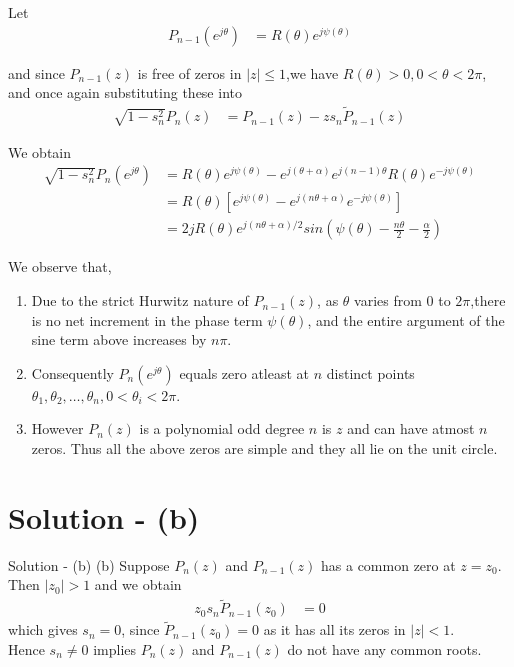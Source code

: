\documentclass{beamer}
\providecommand{\abs}[1]{\left\vert#1\right\vert}
\providecommand{\brak}[1]{\ensuremath{\left(#1\right)}}
\begin{document}
\begin{frame}
    Let 
    \begin{align}
        P_{n-1}(e^{j\theta}) &= R(\theta)e^{j\psi(\theta)}
    \end{align}

    and since $P_{n-1}(z)$ is free of zeros in $|z|\leq 1$,we have $R(\theta)>0,0<\theta<2\pi$, and once again substituting these into 
    \begin{align}
        \sqrt{1-s_n^2}P_n(z) &= P_{n-1}(z)-z s_n\tilde{P}_{n-1}(z)
    \end{align}
    
    We obtain
    \begin{align}
        \sqrt{1-s_n^2}P_n(e^{j\theta}) &= R(\theta)e^{j\psi(\theta)} - e^{j(\theta+\alpha)}e^{j(n-1)\theta}R(\theta)e^{-j\psi(\theta)}\\
        &= R(\theta)[e^{j\psi(\theta)}-e^{j(n\theta+\alpha)}e^{-j\psi(\theta)}]\\
        &= 2jR(\theta)e^{j(n\theta+\alpha)/2} sin\brak{\psi(\theta)-\frac{n\theta}{2}-\frac{\alpha}{2}}
    \end{align}
\end{frame}


\begin{frame}
    We observe that,
    \begin{enumerate}[label=(\roman*)]
        \item Due to the strict Hurwitz nature of $P_{n-1}(z)$, as $\theta$ varies from $0$ to $2\pi$,there is no net increment in the phase term $\psi(\theta)$, and the entire argument of the sine term above increases by $n\pi$.
        \item Consequently $P_n(e^{j\theta})$ equals zero atleast at $n$ distinct points $\theta_1,\theta_2,\dots,\theta_n, 0<\theta_i<2\pi$.
        \item However $P_n(z)$ is a polynomial odd degree $n$ is $z$ and can have atmost $n$ zeros. Thus all the above zeros are simple and they all lie on the unit circle. 
    \end{enumerate}
\end{frame}

\section{Solution - (b)}
    \begin{frame}{Solution - (b)}
    (b)  Suppose $P_n(z)$ and $P_{n-1}(z)$ has a common zero at $z=z_0$. Then $\abs{z_0}>1$ and we obtain
    \begin{align}
        z_0s_n\tilde{P}_{n-1}(z_0) &=0
    \end{align}
    which gives $s_n=0$, since $\tilde{P}_{n-1}(z_0)=0$ as it has all its zeros in $|z|<1$.\\
    Hence $s_n \neq 0$ implies $P_n(z)$ and $P_{n-1}(z)$ do not have any common roots.
\end{frame}
\end{document}
